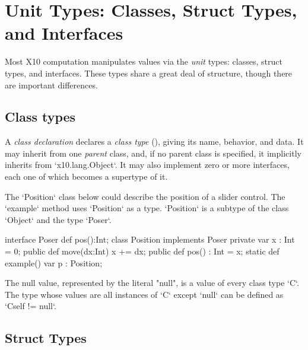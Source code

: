 \section{Unit Types: Classes, Struct Types,  and Interfaces}
\label{ReferenceTypes}

Most X10 computation manipulates values via the {\em unit} types: classes,
struct types, and interfaces.  These types share a great deal of structure,
though there are important differences. 


\subsection{Class types}



A {\em class declaration}  declares a {\em class type} (),
giving its name, behavior, and data.  It may inherit from one {\em parent}
class, and, if no parent class is specified, it implicitly inherits from 
\xcd`x10.lang.Object`.  It may also implement zero or more interfaces, each
one of which becomes a supertype of it.

\begin{ex}
The \xcd`Position` class below could describe the position of a slider
control.  The \xcd`example` method uses \xcd`Position` as a type.
\xcd`Position` is a subtype of the class \xcd`Object` and the type
\xcd`Poser`. 
\begin{xten}
interface Poser {
  def pos():Int;
  }
class Position implements Poser {
  private var x : Int = 0;
  public def move(dx:Int) { x += dx; }
  public def pos() : Int = x;
  static def example() {
    var p : Position; 
  }
}
\end{xten}
%
\end{ex}





The null value, represented by the literal
\xcd"null", is a value of every class type \xcd`C`. The type whose values are
all instances of \xcd`C` except 
\xcd`null` can be defined as \xcd`C{self != null}`.

\subsection{Struct Types}

